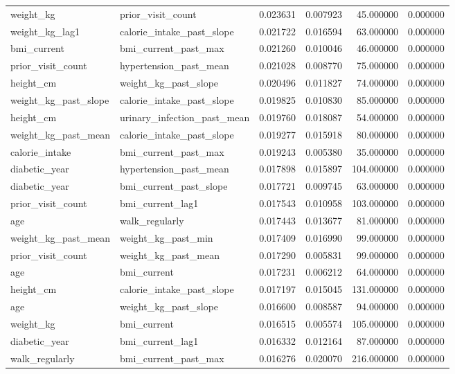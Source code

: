 \begin{longtable}{llrrrr}
weight\_kg & prior\_visit\_count & 0.023631 & 0.007923 & 45.000000 & 0.000000 \\
weight\_kg\_lag1 & calorie\_intake\_past\_slope & 0.021722 & 0.016594 & 63.000000 & 0.000000 \\
bmi\_current & bmi\_current\_past\_max & 0.021260 & 0.010046 & 46.000000 & 0.000000 \\
prior\_visit\_count & hypertension\_past\_mean & 0.021028 & 0.008770 & 75.000000 & 0.000000 \\
height\_cm & weight\_kg\_past\_slope & 0.020496 & 0.011827 & 74.000000 & 0.000000 \\
weight\_kg\_past\_slope & calorie\_intake\_past\_slope & 0.019825 & 0.010830 & 85.000000 & 0.000000 \\
height\_cm & urinary\_infection\_past\_mean & 0.019760 & 0.018087 & 54.000000 & 0.000000 \\
weight\_kg\_past\_mean & calorie\_intake\_past\_slope & 0.019277 & 0.015918 & 80.000000 & 0.000000 \\
calorie\_intake & bmi\_current\_past\_max & 0.019243 & 0.005380 & 35.000000 & 0.000000 \\
diabetic\_year & hypertension\_past\_mean & 0.017898 & 0.015897 & 104.000000 & 0.000000 \\
diabetic\_year & bmi\_current\_past\_slope & 0.017721 & 0.009745 & 63.000000 & 0.000000 \\
prior\_visit\_count & bmi\_current\_lag1 & 0.017543 & 0.010958 & 103.000000 & 0.000000 \\
age & walk\_regularly & 0.017443 & 0.013677 & 81.000000 & 0.000000 \\
weight\_kg\_past\_mean & weight\_kg\_past\_min & 0.017409 & 0.016990 & 99.000000 & 0.000000 \\
prior\_visit\_count & weight\_kg\_past\_mean & 0.017290 & 0.005831 & 99.000000 & 0.000000 \\
age & bmi\_current & 0.017231 & 0.006212 & 64.000000 & 0.000000 \\
height\_cm & calorie\_intake\_past\_slope & 0.017197 & 0.015045 & 131.000000 & 0.000000 \\
age & weight\_kg\_past\_slope & 0.016600 & 0.008587 & 94.000000 & 0.000000 \\
weight\_kg & bmi\_current & 0.016515 & 0.005574 & 105.000000 & 0.000000 \\
diabetic\_year & bmi\_current\_lag1 & 0.016332 & 0.012164 & 87.000000 & 0.000000 \\
walk\_regularly & bmi\_current\_past\_max & 0.016276 & 0.020070 & 216.000000 & 0.000000 \\

\end{longtable}
